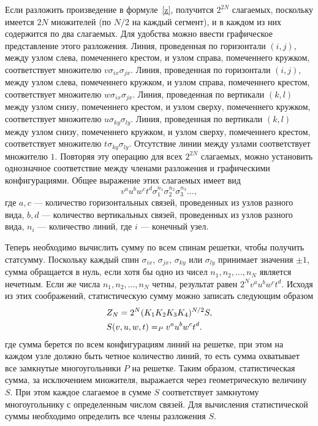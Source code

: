 \documentclass[utf8,12pt]{jetp}
\begin{document}
Если разложить произведение в формуле~\eqref{z}, получится $2^{2N}$ слагаемых, поскольку имеется $2N$ множителей (по $N/2$ на каждый сегмент), и в каждом из них содержится по два слагаемых. Для удобства можно ввести графическое представление этого разложения. Линия, проведенная по горизонтали $(i, j)$, между узлом слева, помеченнего крестом, и узлом справа, помеченнего кружком, соответствует множителю $v\sigma_{ix}\sigma_{jx}$. Линия, проведенная по горизонтали $(i, j)$, между узлом слева, помеченнего кружком, и узлом справа, помеченнего крестом, соответствует множителю $w\sigma_{ix}\sigma_{jx}$. Линия, проведенная по вертикали $(k, l)$ между узлом снизу, помеченнего крестом, и узлом сверху, помеченнего кружком, соответствует множителю $u\sigma_{ky}\sigma_{ly}$. Линия, проведенная по вертикали $(k, l)$ между узлом снизу, помеченнего кружком, и узлом сверху, помеченнего крестом, соответствует множителю $t\sigma_{ky}\sigma_{ly}$. Отсутствие линии между узлами соответствует множителю $1$. Повторяя эту операцию для всех $2^{2N}$ слагаемых, можно установить однозначное соответствие между членами разложения и графическими конфигурациями. Общее выражение этих слагаемых имеет вид
\begin{equation*}
	v^a u^b w^c t^d \sigma_{1}^{n_{1}} \sigma_{2}^{n_{2}} \sigma_{3}^{n_{3}} \dots,
\end{equation*}
где $a, c$ — количество горизонтальных связей, проведенных из узлов разного вида, $b, d$ —  количество вертикальных связей, проведенных из узлов разного вида, $n_i$ — количество линий, где $i$ — конечный узел.

Теперь необходимо вычислить сумму по всем спинам решетки, чтобы получить статсумму. Поскольку каждый спин $\sigma_{ix}$, $\sigma_{jx}$, $\sigma_{ky}$ или $\sigma_{ly}$ принимает значения $\pm 1$, сумма обращается в нуль, если хотя бы одно из чисел $n_1, n_2, \dots, n_N$ является нечетным. Если же числа $n_1, n_2, \dots, n_N$ четны, результат равен $2^N v^a u^b w^c t^d$. Исходя из этих соображений, статистическую сумму можно записать следующим образом
\begin{align}
	&Z_N = 2^N (\ch K_1 \ch K_2 \ch K_3 \ch K_4)^{N/2} S, \nonumber \\
	&S(v, u, w, t) = \sum_P v^a u^b w^c t^d.
	\label{zs}
\end{align}
где сумма берется по всем конфигурациям линий на решетке, при этом на каждом узле должно быть четное количество линий, то есть сумма охватывает все замкнутые многоугольники $P$ на решетке. Таким образом, статистическая сумма, за исключением множителя, выражается через геометрическую величину $S$. При этом каждое слагаемое в сумме $S$ соответствует замкнутому многоугольнику с определенным числом связей. Для вычисления статистической суммы необходимо определить все члены разложения $S$.
\end{document}
